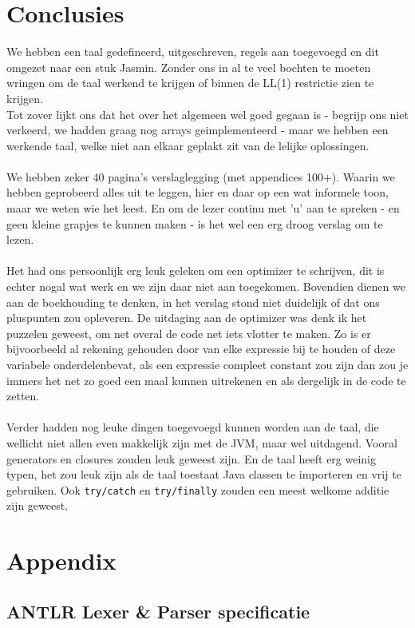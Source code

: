 \documentclass[]{article}
\begin{document}
\section{Conclusies}
We hebben een taal gedefineerd, uitgeschreven, regels aan toegevoegd en dit omgezet naar een stuk Jasmin. Zonder ons in al te veel bochten te moeten wringen om de taal werkend te krijgen of binnen de LL(1) restrictie zien te krijgen. \\ 
Tot zover lijkt ons dat het over het algemeen wel goed gegaan is - begrijp ons niet verkeerd, we hadden graag nog arrays geimplementeerd - maar we hebben een werkende taal, welke niet aan elkaar geplakt zit van de lelijke oplossingen. \\
\\
We hebben zeker 40 pagina's verslaglegging (met appendices 100+). Waarin we hebben geprobeerd alles uit te leggen, hier en daar op een wat informele toon, maar we weten wie het leest. En om de lezer continu met 'u' aan te spreken - en geen kleine grapjes te kunnen maken - is het wel een erg droog verslag om te lezen.\\
\\
Het had ons persoonlijk erg leuk geleken om een optimizer te schrijven, dit is echter nogal wat werk en we zijn daar niet aan toegekomen. Bovendien dienen we aan de boekhouding te denken, in het verslag stond niet duidelijk of dat ons pluspunten zou opleveren.
De uitdaging aan de optimizer was denk ik het puzzelen geweest, om net overal de code net iets vlotter te maken. Zo is er bijvoorbeeld al rekening gehouden door van elke expressie bij te houden of deze variabele onderdelenbevat, als een expressie compleet constant zou zijn dan zou je immers het net zo goed een maal kunnen uitrekenen en als dergelijk in de code te zetten.\\
\\
Verder hadden nog leuke dingen toegevoegd kunnen worden aan de taal, die wellicht niet allen even makkelijk zijn met de JVM, maar wel uitdagend. Vooral generators en closures zouden leuk geweest zijn. En de taal heeft erg weinig typen, het zou leuk zijn als de taal toestaat Java classen te importeren en vrij te gebruiken. Ook \texttt{try/catch} en \texttt{try/finally} zouden een meest welkome additie zijn geweest.\

\newpage
\section{Appendix}

\subsection{ANTLR Lexer \& Parser specificatie}
\end{document}
